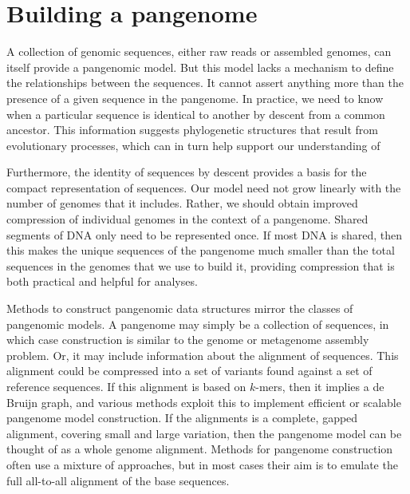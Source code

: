 \section{Building a pangenome}

A collection of genomic sequences, either raw reads or assembled genomes, can itself provide a pangenomic model.
But this model lacks a mechanism to define the relationships between the sequences.
It cannot assert anything more than the presence of a given sequence in the pangenome.
In practice, we need to know when a particular sequence is identical to another by descent from a common ancestor.
This information suggests phylogenetic structures that result from evolutionary processes, which can in turn help support our understanding of 

Furthermore, the identity of sequences by descent provides a basis for the compact representation of sequences.
Our model need not grow linearly with the number of genomes that it includes.
Rather, we should obtain improved compression of individual genomes in the context of a pangenome.
Shared segments of DNA only need to be represented once.
If most DNA is shared, then this makes the unique sequences of the pangenome much smaller than the total sequences in the genomes that we use to build it, providing compression that is both practical and helpful for analyses.

Methods to construct pangenomic data structures mirror the classes of pangenomic models.
A pangenome may simply be a collection of sequences, in which case construction is similar to the genome or metagenome assembly problem.
Or, it may include information about the alignment of sequences.
This alignment could be compressed into a set of variants found against a set of reference sequences.
If this alignment is based on $k$-mers, then it implies a de Bruijn graph, and various methods exploit this to implement efficient or scalable pangenome model construction.
If the alignments is a complete, gapped alignment, covering small and large variation, then the pangenome model can be thought of as a whole genome alignment.
Methods for pangenome construction often use a mixture of approaches, but in most cases their aim is to emulate the full all-to-all alignment of the base sequences.


